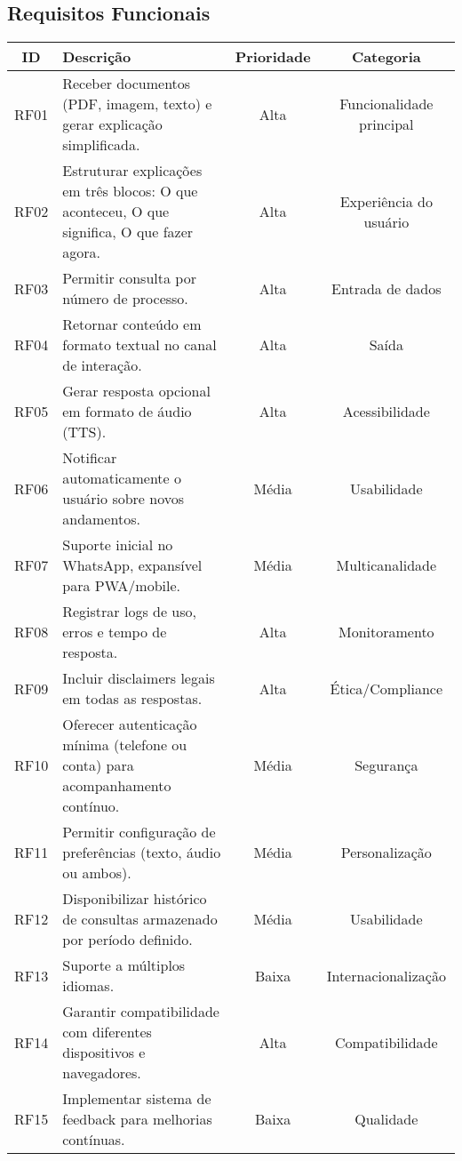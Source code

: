 \documentclass{article}
\begin{document}
\subsection*{Requisitos Funcionais}
\begin{tabular}{|c|p{7cm}|c|c|}
\hline
\textbf{ID} & \textbf{Descrição} & \textbf{Prioridade} & \textbf{Categoria} \\
\hline
RF01 & Receber documentos (PDF, imagem, texto) e gerar explicação simplificada. & Alta & Funcionalidade principal \\\hline
RF02 & Estruturar explicações em três blocos: O que aconteceu, O que significa, O que fazer agora. & Alta & Experiência do usuário \\\hline
RF03 & Permitir consulta por número de processo. & Alta & Entrada de dados \\\hline
RF04 & Retornar conteúdo em formato textual no canal de interação. & Alta & Saída \\\hline
RF05 & Gerar resposta opcional em formato de áudio (TTS). & Alta & Acessibilidade \\\hline
RF06 & Notificar automaticamente o usuário sobre novos andamentos. & Média & Usabilidade \\\hline
RF07 & Suporte inicial no WhatsApp, expansível para PWA/mobile. & Média & Multicanalidade \\\hline
RF08 & Registrar logs de uso, erros e tempo de resposta. & Alta & Monitoramento \\\hline
RF09 & Incluir disclaimers legais em todas as respostas. & Alta & Ética/Compliance \\\hline
RF10 & Oferecer autenticação mínima (telefone ou conta) para acompanhamento contínuo. & Média & Segurança \\\hline
RF11 & Permitir configuração de preferências (texto, áudio ou ambos). & Média & Personalização \\\hline
RF12 & Disponibilizar histórico de consultas armazenado por período definido. & Média & Usabilidade \\\hline
RF13 & Suporte a múltiplos idiomas. & Baixa & Internacionalização \\\hline
RF14 & Garantir compatibilidade com diferentes dispositivos e navegadores. & Alta & Compatibilidade \\\hline
RF15 & Implementar sistema de feedback para melhorias contínuas. & Baixa & Qualidade \\
\hline
\end{tabular}
\end{document}
